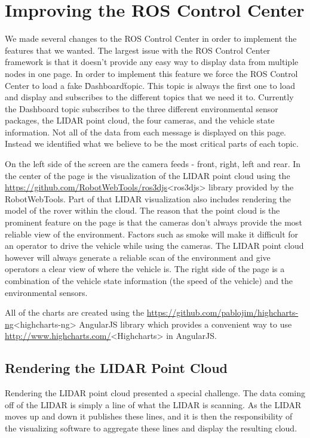 \section{Improving the ROS Control Center}
We made several changes to the ROS Control Center in order to implement the features that we wanted.  The largest issue with the ROS Control Center framework is that it doesn't provide any easy way to display data from multiple nodes in one page.  In order to implement this feature we force the ROS Control Center to load a fake \"Dashboard\" topic.  This topic is always the first one to load and display and subscribes to the different topics that we need it to.  Currently the Dashboard topic subscribes to the three different environmental sensor packages, the LIDAR point cloud, the four cameras, and the vehicle state information.  Not all of the data from each message is displayed on this page.  Instead we identified what we believe to be the most critical parts of each topic.  


On the left side of the screen are the camera feeds - front, right, left and rear.  In the center of the page is the visualization of the LIDAR point cloud using the 
\url{https://github.com/RobotWebTools/ros3djs}<ros3djs> library provided by the RobotWebTools.  Part of that LIDAR visualization also includes rendering the model of the rover within the cloud.  The reason that the point cloud is the prominent feature on the page is that the cameras don't always provide the most reliable view of the environment.  Factors such as smoke will make it difficult for an operator to drive the vehicle while using the cameras.  The LIDAR point cloud however will always generate a reliable scan of the environment and give operators a clear view of where the vehicle is.  The right side of the page is a combination of the vehicle state information (the speed of the vehicle) and the environmental sensors.


All of the charts are created using the \url{https://github.com/pablojim/highcharts-ng}<highcharts-ng> AngularJS library which provides a convenient way to use \url{http://www.highcharts.com/}<Highcharts> in AngularJS.

\subsection{Rendering the LIDAR Point Cloud}
Rendering the LIDAR point cloud presented a special challenge.  The data coming off of the LIDAR is simply a line of what the LIDAR is scanning.  As the LIDAR moves up and down it publishes these lines, and it is then the responsibility of the visualizing software to aggregate these lines and display the resulting cloud.

